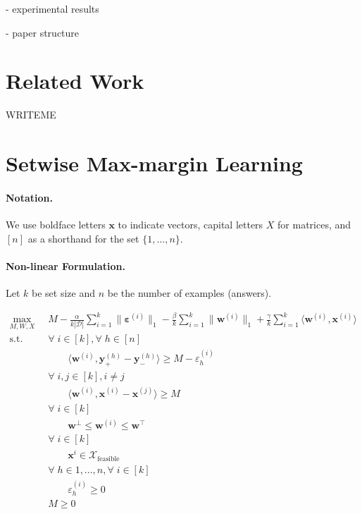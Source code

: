 \documentclass{article}
\renewcommand\[{\begin{equation}}
\renewcommand\]{\end{equation}}
\newcommand{\calvar}[1]{\ensuremath{\mathcal{#1}}}
\newcommand{\calD}{\calvar{D}}
\newcommand{\calX}{\calvar{X}}
\newcommand{\vecvar}[1]{\ensuremath{\boldsymbol{#1}}}
\newcommand{\vw}{\vecvar{w}}
\newcommand{\vx}{\vecvar{x}}
\newcommand{\vy}{\vecvar{y}}
\newcommand{\veps}{\vecvar{\varepsilon}}
\begin{document}
- experimental results

- paper structure


\section{Related Work}

WRITEME

\section{Setwise Max-margin Learning}

\paragraph{Notation.} We use boldface letters $\vx$ to indicate vectors,
capital letters $X$ for matrices, and $[n]$ as a shorthand for the set $\{1, \ldots, n\}$.

\paragraph{Non-linear Formulation.}

Let $k$ be set size and $n$ be the number of examples (answers).

{\footnotesize

\begin{align}
    \max_{M, W, X}
        & \;\; M - \frac{\alpha}{k |\calD|} \sum_{i=1}^k \| \veps^{(i)} \|_1 - \frac{\beta}{k} \sum_{i=1}^k \| \vw^{(i)} \|_1 + \frac{\gamma}{k} \sum_{i=1}^k \langle \vw^{(i)}, \vx^{(i)} \rangle
        \nonumber
    \\
    \text{s.t.}
        & \;\; \forall \; i \in [k] \nonumber, \forall \; h \in [n]
    \\
        & \;\; \qquad \langle \vw^{(i)}, \vy^{(h)}_+ - \vy^{(h)}_- \rangle \geq M - \varepsilon^{(i)}_h \nonumber
    \\
        & \;\; \forall \; i, j \in [k], i \neq j \nonumber
    \\
        & \;\; \qquad \langle \vw^{(i)}, \vx^{(i)} - \vx^{(j)} \rangle \geq M \label{cnst-ws-m}
    \\
        & \;\; \forall \; i \in [k] \nonumber
    \\
        & \;\; \qquad \vw^\bot \leq \vw^{(i)} \leq \vw^\top \nonumber
    \\
        & \;\; \forall \; i \in [k] \nonumber
    \\
        & \;\; \qquad \vx^i \in \calX_{\text{feasible}} \nonumber
    \\
        & \;\; \forall \; h \in 1, \ldots, n, \forall \; i \in [k] \nonumber
    \\
        & \;\; \qquad \varepsilon^{(i)}_h \geq 0 \nonumber
    \\
        & \;\; M \geq 0 \nonumber
\end{align}

}
\end{document}

